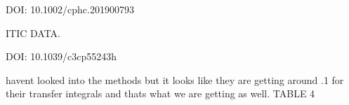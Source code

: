 DOI: 10.1002/cphc.201900793

        ITIC DATA.

DOI: 10.1039/c3cp55243h

    havent looked into the methods but it looks like they are getting around .1 for their transfer
    integrals and thats what we are getting as well.  TABLE 4
